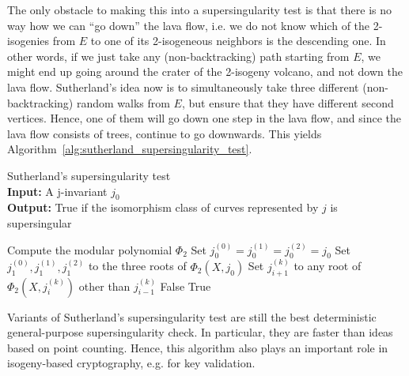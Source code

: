 The only obstacle to making this into a supersingularity test is that there is no way how we can ``go down'' the lava flow, i.e. we do not know which of the 2-isogenies from $E$ to one of its 2-isogeneous neighbors is the descending one.
In other words, if we just take any (non-backtracking) path starting from $E$, we might end up going around the crater of the 2-isogeny volcano, and not down the lava flow.
Sutherland's idea now is to simultaneously take three different (non-backtracking) random walks from $E$, but ensure that they have different second vertices.
Hence, one of them will go down one step in the lava flow, and since the lava flow consists of trees, continue to go downwards.
This yields Algorithm~\ref{alg:sutherland_supersingularity_test}.
\begin{algorithm}
\caption{\label{alg:sutherland_supersingularity_test} Sutherland's supersingularity test\\
\textbf{Input:} A j-invariant $j_0$\\
\textbf{Output:} True if the isomorphism class of curves represented by $j$ is supersingular}
\begin{algorithmic}[1]
\State Compute the modular polynomial $\Phi_2$
\State Set $j_0^{(0)} = j_0^{(1)} = j_0^{(2)} = j_0$
\State Set $j_1^{(0)}, j_1^{(1)}, j_1^{(2)}$ to the three roots of $\Phi_2(X, j_0)$
        \State Set $j_{i + 1}^{(k)}$ to any root of $\Phi_2(X, j_i^{(k)})$ other than $j_{i - 1}^{(k)}$
            \Return False
        \EndIf
    \EndFor
\EndFor
\State \Return True
\end{algorithmic}
\end{algorithm}

Variants of Sutherland's supersingularity test are still the best deterministic general-purpose supersingularity check.
In particular, they are faster than ideas based on point counting.
Hence, this algorithm also plays an important role in isogeny-based cryptography, e.g. for key validation.

